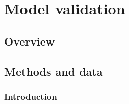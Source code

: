 \documentclass[final,3p,times,authoryear]{elsarticle}
\begin{document}
\section{Model validation}\label{sec:validation}
\subsection{Overview}\label{sec:validationover}




\subsection{Methods and data}\label{sec:methods}
\subsubsection{Introduction}\label{sec:methodsintro}

\end{document}
